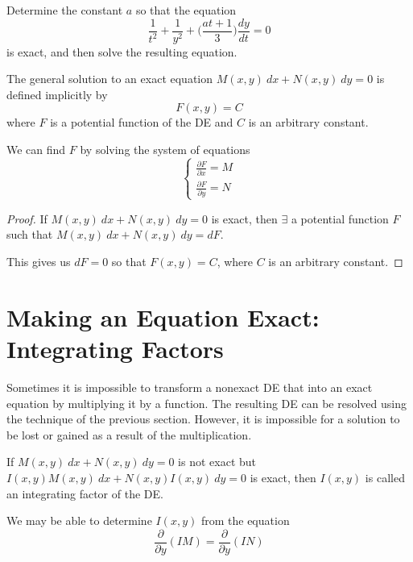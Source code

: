 \begin{example}
    Determine the constant $a$ so that the equation 
    \[
        \frac{1}{t^2} + \frac{1}{y^2} + \biggl(\frac{at+1}{3}\biggr) \frac{dy}{dt} = 0
    \]
    is exact, and then solve the resulting equation.
\end{example}

\begin{theorem}
    The general solution to an exact equation $M(x,y)\>dx + N(x,y)\>dy = 0$ is 
    defined implicitly by 
    \begin{equation}
        F(x,y) = C
    \end{equation}
    where $F$ is a potential function of the DE and $C$ is an 
    arbitrary constant.
\end{theorem}
\begin{remark}
    We can find $F$ by solving the system of equations 
    \begin{equation}
        \begin{cases}
            \displaystyle 
            \frac{\partial F}{\partial x} = M\\[1em]
            \displaystyle 
            \frac{\partial F}{\partial y} = N
        \end{cases}
    \end{equation}
\end{remark}

\begin{proof}
    If $M(x,y)\>dx + N(x,y)\>dy = 0$ is exact, then $\exists$ a potential
    function $F$ such that $M(x,y)\>dx + N(x,y)\>dy = dF$.

    This gives us $dF = 0$ so that $F(x,y) = C$, where $C$ is an arbitrary 
    constant.
\end{proof}

\section{Making an Equation Exact: Integrating Factors}

Sometimes it is impossible to transform a nonexact DE that into an exact 
equation by multiplying it by a function. The resulting DE can be resolved using the technique
 of the previous section. However, it is impossible for a solution to be lost or gained as 
a result of the multiplication.

\begin{definition}
    If $M(x,y)\>dx + N(x,y)\>dy = 0$ is not exact but 
    $I(x,y)M(x,y)\>dx + N(x,y)I(x,y)\>dy = 0$ is exact, then $I(x,y)$ is called 
    an integrating factor of the DE.
\end{definition}
\begin{remark}
    We may be able to determine $I(x,y)$ from the equation 
    \begin{equation}
        \frac{\partial}{\partial y}(IM) = \frac{\partial}{\partial y}(IN)
    \end{equation}
\end{remark}

